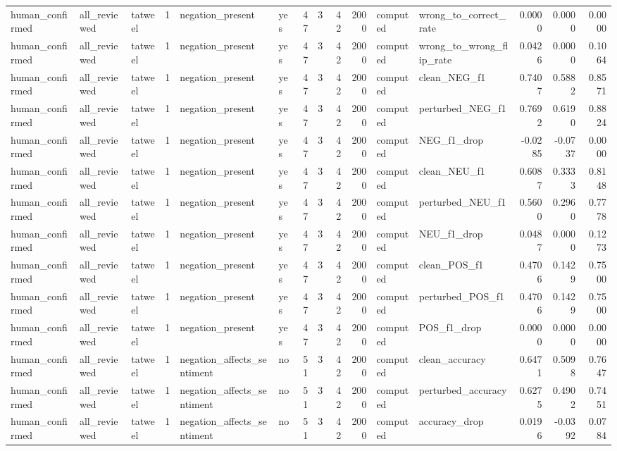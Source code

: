 \begin{tabular}{lllrllrrrrllrrr}
human_confirmed & all_reviewed & tatweel & 1 & negation_present & yes & 47 & 3 & 42 & 2000 & computed & wrong_to_correct_rate & 0.0000 & 0.0000 & 0.0000 \\
human_confirmed & all_reviewed & tatweel & 1 & negation_present & yes & 47 & 3 & 42 & 2000 & computed & wrong_to_wrong_flip_rate & 0.0426 & 0.0000 & 0.1064 \\
human_confirmed & all_reviewed & tatweel & 1 & negation_present & yes & 47 & 3 & 42 & 2000 & computed & clean_NEG_f1 & 0.7407 & 0.5882 & 0.8571 \\
human_confirmed & all_reviewed & tatweel & 1 & negation_present & yes & 47 & 3 & 42 & 2000 & computed & perturbed_NEG_f1 & 0.7692 & 0.6190 & 0.8824 \\
human_confirmed & all_reviewed & tatweel & 1 & negation_present & yes & 47 & 3 & 42 & 2000 & computed & NEG_f1_drop & -0.0285 & -0.0737 & 0.0000 \\
human_confirmed & all_reviewed & tatweel & 1 & negation_present & yes & 47 & 3 & 42 & 2000 & computed & clean_NEU_f1 & 0.6087 & 0.3333 & 0.8148 \\
human_confirmed & all_reviewed & tatweel & 1 & negation_present & yes & 47 & 3 & 42 & 2000 & computed & perturbed_NEU_f1 & 0.5600 & 0.2960 & 0.7778 \\
human_confirmed & all_reviewed & tatweel & 1 & negation_present & yes & 47 & 3 & 42 & 2000 & computed & NEU_f1_drop & 0.0487 & 0.0000 & 0.1273 \\
human_confirmed & all_reviewed & tatweel & 1 & negation_present & yes & 47 & 3 & 42 & 2000 & computed & clean_POS_f1 & 0.4706 & 0.1429 & 0.7500 \\
human_confirmed & all_reviewed & tatweel & 1 & negation_present & yes & 47 & 3 & 42 & 2000 & computed & perturbed_POS_f1 & 0.4706 & 0.1429 & 0.7500 \\
human_confirmed & all_reviewed & tatweel & 1 & negation_present & yes & 47 & 3 & 42 & 2000 & computed & POS_f1_drop & 0.0000 & 0.0000 & 0.0000 \\
human_confirmed & all_reviewed & tatweel & 1 & negation_affects_sentiment & no & 51 & 3 & 42 & 2000 & computed & clean_accuracy & 0.6471 & 0.5098 & 0.7647 \\
human_confirmed & all_reviewed & tatweel & 1 & negation_affects_sentiment & no & 51 & 3 & 42 & 2000 & computed & perturbed_accuracy & 0.6275 & 0.4902 & 0.7451 \\
human_confirmed & all_reviewed & tatweel & 1 & negation_affects_sentiment & no & 51 & 3 & 42 & 2000 & computed & accuracy_drop & 0.0196 & -0.0392 & 0.0784 \\

\end{tabular}
